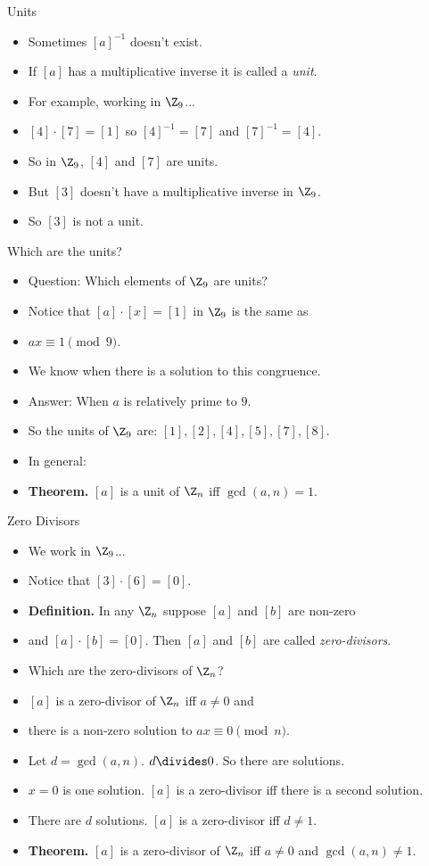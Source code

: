 \documentclass[handout]{beamer}
\begin{document}
\begin{frame}{Units}
\begin{itemize}
  \item Sometimes $[a]^{-1}$ doesn't exist.
  \item If $[a]$ has a multiplicative inverse it is called a \emph{unit}.
  \item For example, working in $\Z_9$...
  \item $[4]\cdot [7] = [1]$ so $[4]^{-1} = [7]$ and $[7]^{-1} = [4]$.
  \item So in $\Z_9$, $[4]$ and $[7]$ are units.
  \item But $[3]$ doesn't have a multiplicative inverse in $\Z_9$.
  \item So $[3]$ is not a unit.
\end{itemize}
\end{frame}

\begin{frame}{Which are the units?}
\begin{itemize}
  \item Question: Which elements of $\Z_9$ are units?
  \item Notice that $[a]\cdot[x] = [1]$ in $\Z_9$ is the same as
  \item $ax \equiv 1 \pmod 9$.
  \item We know when there is a solution to this congruence.
  \item Answer: When $a$ is relatively prime to $9$.
  \item So the units of $\Z_9$ are: $[1],[2],[4],[5],[7],[8]$.
  \item In general:
  \item \textbf{Theorem.} $[a]$ is a unit of $\Z_n$ iff $\gcd(a, n) = 1$.
\end{itemize}
\end{frame}

\begin{frame}{Zero Divisors}
\begin{itemize}
  \item We work in $\Z_9$...
  \item Notice that $[3] \cdot [6] = [0]$.
  \item \textbf{Definition.} In any $\Z_n$ suppose $[a]$ and $[b]$ are non-zero
  \item and $[a]\cdot [b] = [0]$. Then $[a]$ and $[b]$ are called \emph{zero-divisors}.
  \item Which are the zero-divisors of $\Z_n$?
  \item $[a]$ is a zero-divisor of $\Z_n$ iff $a\not=0$ and
  \item there is a non-zero solution to $ax \equiv 0 \pmod n$.
  \item Let $d=\gcd(a,n)$. $d\divides 0$. So there are solutions.
  \item $x=0$ is one solution. $[a]$ is a zero-divisor iff there is a second solution.
  \item There are $d$ solutions. $[a]$ is a zero-divisor iff $d\not=1$.
  \item \textbf{Theorem.} $[a]$ is a zero-divisor of $\Z_n$ iff $a\not=0$ and $\gcd(a, n) \not= 1$.
\end{itemize}
\end{frame}
\end{document}
